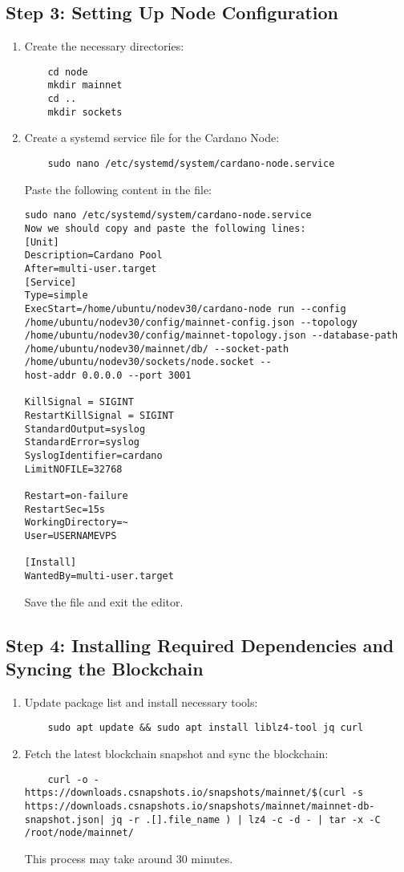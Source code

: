 \subsection{Step 3: Setting Up Node Configuration}
\begin{enumerate}
    \item Create the necessary directories:
    \begin{verbatim}
    cd node
    mkdir mainnet
    cd ..
    mkdir sockets
    \end{verbatim}
    \item Create a systemd service file for the Cardano Node:
    \begin{verbatim}
    sudo nano /etc/systemd/system/cardano-node.service
    \end{verbatim}
    
    Paste the following content in the file:

    \begin{verbatim}
sudo nano /etc/systemd/system/cardano-node.service
Now we should copy and paste the following lines:
[Unit]
Description=Cardano Pool
After=multi-user.target
[Service]
Type=simple
ExecStart=/home/ubuntu/nodev30/cardano-node run --config
/home/ubuntu/nodev30/config/mainnet-config.json --topology
/home/ubuntu/nodev30/config/mainnet-topology.json --database-path
/home/ubuntu/nodev30/mainnet/db/ --socket-path  /home/ubuntu/nodev30/sockets/node.socket --
host-addr 0.0.0.0 --port 3001

KillSignal = SIGINT
RestartKillSignal = SIGINT
StandardOutput=syslog
StandardError=syslog
SyslogIdentifier=cardano
LimitNOFILE=32768

Restart=on-failure
RestartSec=15s
WorkingDirectory=~
User=USERNAMEVPS

[Install]
WantedBy=multi-user.target
    \end{verbatim}

    Save the file and exit the editor.
\end{enumerate}

\subsection{Step 4: Installing Required Dependencies and Syncing the Blockchain}
\begin{enumerate}
    \item Update package list and install necessary tools:
    \begin{verbatim}
    sudo apt update && sudo apt install liblz4-tool jq curl
    \end{verbatim}
    \item Fetch the latest blockchain snapshot and sync the blockchain:
    \begin{verbatim}
    curl -o - https://downloads.csnapshots.io/snapshots/mainnet/$(curl -s https://downloads.csnapshots.io/snapshots/mainnet/mainnet-db-snapshot.json| jq -r .[].file_name ) | lz4 -c -d - | tar -x -C /root/node/mainnet/
    \end{verbatim}
    This process may take around 30 minutes.
\end{enumerate}

